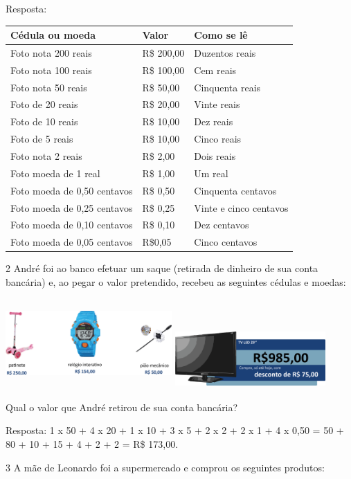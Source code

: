 \begin{multicols}{2}
{Resposta:

\begin{longtable}[]{@{}lll@{}}
\toprule
Cédula ou moeda & Valor & Como se lê\tabularnewline
\midrule
\endhead
Foto nota 200 reais & R\$ 200,00 & Duzentos reais\tabularnewline
Foto nota 100 reais & R\$ 100,00 & Cem reais\tabularnewline
Foto nota 50 reais & R\$ 50,00 & Cinquenta reais\tabularnewline
Foto de 20 reais & R\$ 20,00 & Vinte reais\tabularnewline
Foto de 10 reais & R\$ 10,00 & Dez reais\tabularnewline
Foto de 5 reais & R\$ 10,00 & Cinco reais\tabularnewline
Foto nota 2 reais & R\$ 2,00 & Dois reais\tabularnewline
Foto moeda de 1 real & R\$ 1,00 & Um real\tabularnewline
Foto moeda de 0,50 centavos & R\$ 0,50 & Cinquenta
centavos\tabularnewline
Foto moeda de 0,25 centavos & R\$ 0,25 & Vinte e cinco
centavos\tabularnewline
Foto moeda de 0,10 centavos & R\$ 0,10 & Dez centavos\tabularnewline
Foto moeda de 0,05 centavos & R\$0,05 & Cinco centavos\tabularnewline
\bottomrule
\end{longtable}

\num{2} André foi ao banco efetuar um saque (retirada de dinheiro de sua conta
bancária) e, ao pegar o valor pretendido, recebeu as seguintes cédulas e moedas:


\includegraphics[width=2.50022in,height=1.34178in]{media/image72.png}
\includegraphics[width=2.26686in,height=0.87508in]{media/image73.png}

Qual o valor que André retirou de sua conta bancária?


Resposta:
1 x 50 + 4 x 20 + 1 x 10 + 3 x 5 + 2 x 2 + 2 x 1 + 4 x 0,50 = 50 + 80 +
10 + 15 + 4 + 2 + 2 = R\$ 173,00.

\num{3} A mãe de Leonardo foi a supermercado e comprou os seguintes produtos:

}
\end{multicols}

